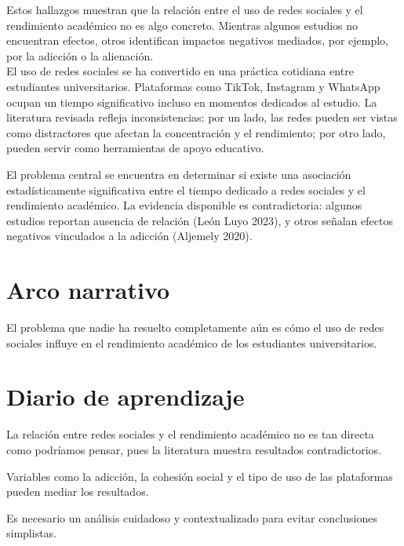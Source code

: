 \documentclass[12pt]{article}
\begin{document}
Estos hallazgos muestran que la relación entre el uso de redes sociales y el rendimiento académico no es algo concreto. Mientras algunos estudios no encuentran efectos, otros identifican impactos negativos mediados, por ejemplo, por la adicción o la alienación.
\\

El uso de redes sociales se ha convertido en una práctica cotidiana entre estudiantes universitarios. Plataformas como TikTok, Instagram y WhatsApp ocupan un tiempo significativo incluso en momentos dedicados al estudio. La literatura revisada refleja inconsistencias: por un lado, las redes pueden ser vistas como distractores que afectan la concentración y el rendimiento; por otro lado, pueden servir como herramientas de apoyo educativo.

El problema central se encuentra en determinar si existe una asociación estadísticamente significativa entre el tiempo dedicado a redes sociales y el rendimiento académico. La evidencia disponible es contradictoria: algunos estudios reportan ausencia de relación (León Luyo 2023), y otros señalan efectos negativos vinculados a la adicción (Aljemely 2020).  


\section{Arco narrativo}
El problema que nadie ha resuelto completamente aún es cómo el uso de redes sociales influye en el rendimiento académico de los estudiantes universitarios.

\section{Diario de aprendizaje}
 
La relación entre redes sociales y el rendimiento académico no es tan directa como podríamos pensar, pues la literatura muestra resultados contradictorios.

Variables como la adicción, la cohesión social y el tipo de uso de las plataformas pueden mediar los resultados. 

Es necesario un análisis cuidadoso y contextualizado para evitar conclusiones simplistas.
\end{document}
